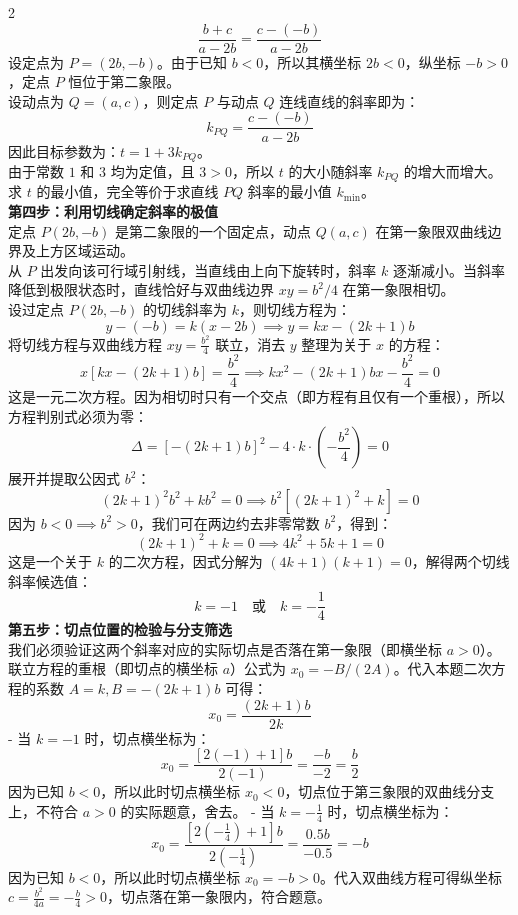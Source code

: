\documentclass[11pt,a4paper]{ctexart}
\begin{document}
\begin{paracol}{2}
{  $$\frac{b+c}{a-2b} = \frac{c - (-b)}{a - 2b}$$
  设定点为 $P = (2b, -b)$。由于已知 $b < 0$，所以其横坐标 $2b < 0$，纵坐标 $-b > 0$，定点 $P$ 恒位于第二象限。\\
  设动点为 $Q = (a, c)$，则定点 $P$ 与动点 $Q$ 连线直线的斜率即为：
  $$k_{PQ} = \frac{c - (-b)}{a - 2b}$$
  因此目标参数为：$t = 1 + 3k_{PQ}$。\\
  由于常数 $1$ 和 $3$ 均为定值，且 $3 > 0$，所以 $t$ 的大小随斜率 $k_{PQ}$ 的增大而增大。求 $t$ 的最小值，完全等价于求直线 $PQ$ 斜率的最小值 $k_{\min}$。\\[0.3em]
  \textbf{第四步：利用切线确定斜率的极值}\\
  定点 $P(2b, -b)$ 是第二象限的一个固定点，动点 $Q(a,c)$ 在第一象限双曲线边界及上方区域运动。\\
  从 $P$ 出发向该可行域引射线，当直线由上向下旋转时，斜率 $k$ 逐渐减小。当斜率降低到极限状态时，直线恰好与双曲线边界 $xy = b^2/4$ 在第一象限相切。\\
  设过定点 $P(2b, -b)$ 的切线斜率为 $k$，则切线方程为：
  $$y - (-b) = k(x - 2b) \implies y = kx - (2k+1)b$$
  将切线方程与双曲线方程 $xy = \frac{b^2}{4}$ 联立，消去 $y$ 整理为关于 $x$ 的方程：
  $$x\left[kx - (2k+1)b\right] = \frac{b^2}{4} \implies kx^2 - (2k+1)bx - \frac{b^2}{4} = 0$$
  这是一元二次方程。因为相切时只有一个交点（即方程有且仅有一个重根），所以方程判别式必须为零：
  $$\Delta = \left[-(2k+1)b\right]^2 - 4 \cdot k \cdot \left(-\frac{b^2}{4}\right) = 0$$
  展开并提取公因式 $b^2$：
  $$(2k+1)^2b^2 + kb^2 = 0 \implies b^2\left[(2k+1)^2 + k\right] = 0$$
  因为 $b < 0 \implies b^2 > 0$，我们可在两边约去非零常数 $b^2$，得到：
  $$(2k+1)^2 + k = 0 \implies 4k^2 + 5k + 1 = 0$$
  这是一个关于 $k$ 的二次方程，因式分解为 $(4k+1)(k+1) = 0$，解得两个切线斜率候选值：
  $$k = -1 \quad \text{或} \quad k = -\frac{1}{4}$$
  \textbf{第五步：切点位置的检验与分支筛选}\\
  我们必须验证这两个斜率对应的实际切点是否落在第一象限（即横坐标 $a > 0$）。\\
  联立方程的重根（即切点的横坐标 $a$）公式为 $x_0 = -B/(2A)$。代入本题二次方程的系数 $A=k, B=-(2k+1)b$ 可得：
  $$x_0 = \frac{(2k+1)b}{2k}$$
  - 当 $k = -1$ 时，切点横坐标为：
    $$x_0 = \frac{[2(-1)+1]b}{2(-1)} = \frac{-b}{-2} = \frac{b}{2}$$
    因为已知 $b < 0$，所以此时切点横坐标 $x_0 < 0$，切点位于第三象限的双曲线分支上，不符合 $a>0$ 的实际题意，舍去。
  - 当 $k = -\frac{1}{4}$ 时，切点横坐标为：
    $$x_0 = \frac{[2(-\frac{1}{4})+1]b}{2(-\frac{1}{4})} = \frac{0.5b}{-0.5} = -b$$
    因为已知 $b < 0$，所以此时切点横坐标 $x_0 = -b > 0$。代入双曲线方程可得纵坐标 $c = \frac{b^2}{4a} = -\frac{b}{4} > 0$，切点落在第一象限内，符合题意。
}
\end{paracol}
\end{document}
